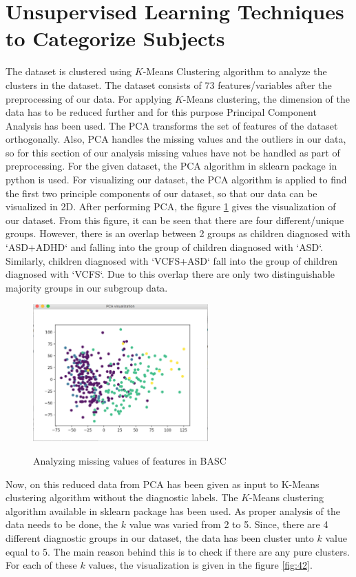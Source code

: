 \section{Unsupervised Learning Techniques to Categorize Subjects}
The dataset is clustered using $K$-Means Clustering algorithm to analyze the clusters in the dataset. The dataset consists of 73 features/variables after the preprocessing of our data. For applying $K$-Means clustering, the dimension of the data has to be reduced further and for this purpose Principal Component Analysis has been used. The PCA transforms the set of features of the dataset orthogonally. Also, PCA handles the missing values and the outliers in our data, so for this section of our analysis missing values have not be handled as part of preprocessing. For the given dataset, the PCA algorithm in sklearn package in python is used. For visualizing our dataset, the PCA algorithm is applied to find the first two principle components of our dataset, so that our data can be visualized in 2D. After performing PCA, the figure \ref{fig:41} gives the visualization of our dataset. From this figure, it can be seen that there are four different/unique groups. However, there is an overlap between 2 groups as children diagnosed with `ASD+ADHD` and falling into the group of children diagnosed with `ASD`. Similarly, children diagnosed with `VCFS+ASD` fall into the group of children diagnosed with `VCFS`. Due to this overlap there are only two distinguishable majority groups in our subgroup data.
\begin{figure}
\centering
  {\includegraphics[width=0.6\textwidth]{Figures/Figure_4_1.png}}
  \caption{Analyzing missing values of features in BASC}
  \label{fig:41}
\end{figure}
Now, on this reduced data from PCA has been given as input to K-Means clustering algorithm without the diagnostic labels. The $K$-Means clustering algorithm available in sklearn package has been used. As proper analysis of the data needs to be done, the $k$ value was varied from 2 to 5. Since, there are 4 different diagnostic groups in our dataset, the data has been cluster unto $k$ value equal to 5. The main reason behind this is to check if there are any pure clusters. For each of these $k$ values, the visualization is given in the figure \ref{fig:42}.

